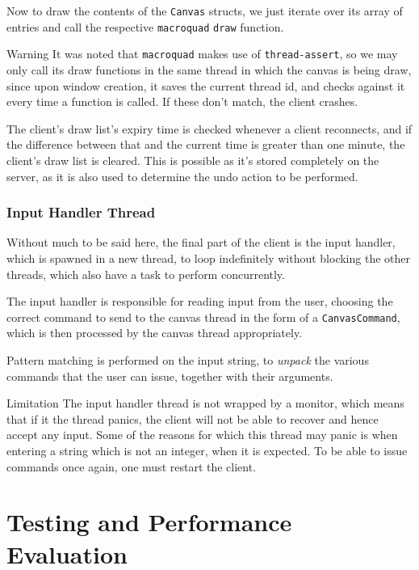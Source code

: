 \documentclass{article}
\newcommand{\code}[1]{\texttt{#1}}
\begin{document}
Now to draw the contents of the \code{Canvas} structs, we just iterate over its
array of entries and call the respective \code{macroquad} \code{draw} function.

\begin{warningbox}{Warning} It was noted that \code{macroquad} makes use of
    \code{thread-assert}, so we may only call its draw functions in the same
    thread in which the canvas is being draw, since upon window creation, it
    saves the current thread id, and checks against it every time a function is
    called. If these don't match, the client crashes.
\end{warningbox}

The client's draw list's expiry time is checked whenever a client reconnects, and
if the difference between that and the current time is greater than one minute,
the client's draw list is cleared. This is possible as it's stored completely on
the server, as it is also used to determine the undo action to be performed.

\newpage

\subsubsection{Input Handler Thread}

Without much to be said here, the final part of the client is the input handler, which is spawned in a new thread, to loop indefinitely without blocking the other threads, which also have a task to perform concurrently.

The input handler is responsible for reading input from the user, choosing the correct command to send to the canvas thread in the form of a \code{CanvasCommand}, which is then processed by the canvas thread appropriately.

Pattern matching is performed on the input string, to \textit{unpack} the
various commands that the user can issue, together with their arguments.

\begin{warningbox}{Limitation}
    The input handler thread is not wrapped by a monitor, which means that if it the thread panics, the client will not be able to recover and hence accept any input. Some of the reasons for which this thread may panic is when entering a string which is not an integer, when it is expected. To be able to issue commands once again, one must restart the client.
\end{warningbox}


\section{Testing and Performance Evaluation}
\end{document}
